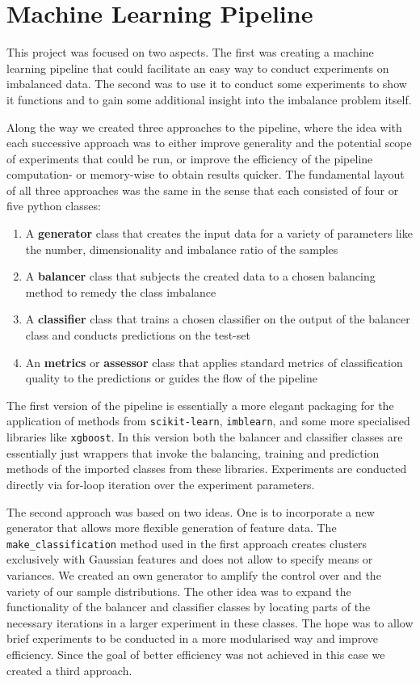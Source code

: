 \section{Machine Learning Pipeline}

This project was focused on two aspects.
The first was creating a machine learning pipeline that could facilitate an easy way to conduct experiments on imbalanced data.
The second was to use it to conduct some experiments to show it functions and to gain some additional insight into the imbalance problem itself.

Along the way we created three approaches to the pipeline, 
where the idea with each successive approach was to either improve generality and the potential scope of experiments that could be run,
or improve the efficiency of the pipeline computation- or memory-wise to obtain results quicker.
The fundamental layout of all three approaches was the same in the sense that each consisted of four or five python classes:
\begin{enumerate}[label=\arabic*)]
\item A \textbf{generator} class that creates the input data for a variety of parameters like the number, dimensionality and imbalance ratio of the samples
\item A \textbf{balancer} class that subjects the created data to a chosen balancing method to remedy the class imbalance
\item A \textbf{classifier} class that trains a chosen classifier on the output of the balancer class and conducts predictions on the test-set
\item An \textbf{metrics} or \textbf{assessor} class that applies standard metrics of classification quality to the predictions or guides the flow of the pipeline
\end{enumerate}

The first version of the pipeline is essentially a more elegant packaging for the application of methods from \texttt{scikit-learn}, \texttt{imblearn}, 
and some more specialised libraries like \texttt{xgboost}. 
In this version both the balancer and classifier classes are essentially just wrappers that invoke the balancing, 
training and prediction methods of the imported classes from these libraries.
Experiments are conducted directly via for-loop iteration over the experiment parameters.

The second approach was based on two ideas. One is to incorporate a new generator that allows more flexible generation of feature data.
The \texttt{make\_classification} method used in the first approach creates clusters exclusively with Gaussian features and does not allow to specify means or variances.
We created an own generator to amplify the control over and the variety of our sample distributions.
The other idea was to expand the functionality of the balancer and classifier classes by locating parts of the necessary iterations in a larger experiment in these classes.
The hope was to allow brief experiments to be conducted in a more modularised way and improve efficiency.
Since the goal of better efficiency was not achieved in this case we created a third approach.

